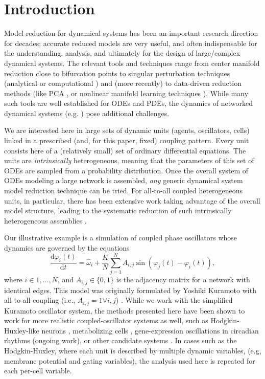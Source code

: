 \documentclass[numbers]{frontiersSCNS}
\newcommand{\diff}{\mathrm{d}}  %
\newcommand{\numNodes}{{N}}
\newcommand{\couplingK}{{K}}
\begin{document}
\section{Introduction}
\label{sec:introduction}


Model reduction for dynamical systems has been an important
research direction for decades; accurate reduced models are very useful,
and often indispensable for the understanding, analysis, and ultimately
for the design of large/complex dynamical systems.
%
The relevant tools and techniques range from center manifold reduction close to
bifurcation points \cite{Guckenheimer2002}
to singular perturbation techniques (analytical \cite{Bender2015} or computational
\cite{Kevorkian1996}%
)
%
%
and (more recently) to data-driven reduction methods (like PCA \cite{Jolliffe2002},
or nonlinear manifold learning techniques \cite{Coifman2005,Dsilva2016}).
%
While many such tools are well established for ODEs and PDEs, the dynamics of networked dynamical
systems (e.g. \cite{Newman2006}) pose additional challenges.

We are interested here in large sets of dynamic units (agents, oscillators, cells) linked in
a prescribed (and, for this paper, fixed) coupling pattern.
%
Every unit consists here of a (relatively small) set of ordinary differential equations.
%
The units are \emph{intrinsically} heterogeneous, meaning that the parameters of this set of ODEs are sampled
from a probability distribution.
%
Once the overall system of ODEs
modeling a large network is assembled, \emph{any} generic dynamical system model reduction technique can be tried.
%
For all-to-all coupled heterogeneous units, in particular, there has been extensive
work taking advantage of the overall model structure, leading to the systematic reduction of such
intrinsically heterogeneous assemblies \cite{Laing2016,Ott2008,Ott2009}.

Our illustrative example is a simulation of coupled phase oscillators
whose dynamics are governed by the equations
\begin{equation}
\label{eqn:kuramoto}
    \frac{\diff \varphi_i(t)}{\diff t} = \hat\omega_i +
    \frac{\couplingK}{\numNodes}\sum_{j=1}^\numNodes A_{i,j}\sin(\varphi_j(t) - \varphi_i(t)),
\end{equation}
where $i\in1,\ldots,\numNodes$,
and
$A_{i,j}\in\{0,1\}$ is the adjacency matrix for a network with identical edges.
%
This model was originally formulated by Yoshiki Kuramoto with all-to-all coupling
(i.e., $A_{i,j}=1\forall i,j$)
\cite{Kuramoto1975,Kuramoto1984}.
%
While we work with the simplified Kuramoto oscillator system,
the methods presented here have been shown to work
for more realistic coupled-oscillator systems as well,
such as Hodgkin-Huxley-like neurons \cite{Choi2016},
metabolizing cells \cite{Bold2007a},
gene-expression oscillations in circadian rhythms (ongoing work),
or other candidate systems \cite{Ashwin2016}.
%
In cases such as the Hodgkin-Huxley, where each unit is described by multiple dynamic variables,
(e.g, membrane potential and gating variables),
the analysis used here is repeated for each per-cell variable.
\end{document}
